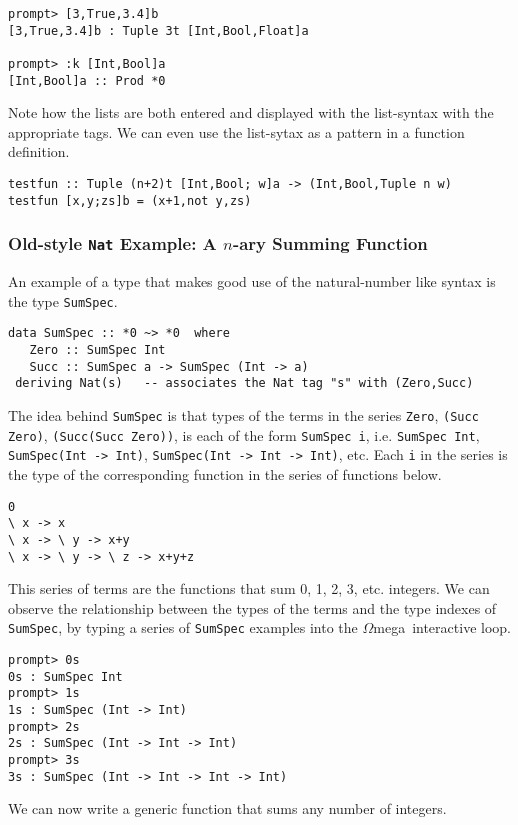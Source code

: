 \documentclass[11pt,twoside]{article}
\newcommand{\om}{$\Omega$mega}
\begin{document}
\begin{verbatim}
prompt> [3,True,3.4]b
[3,True,3.4]b : Tuple 3t [Int,Bool,Float]a

prompt> :k [Int,Bool]a
[Int,Bool]a :: Prod *0 
\end{verbatim} 

Note how the lists are both entered and displayed with
the list-syntax with the appropriate tags. We can even use the list-sytax
as a pattern in a function definition.

\begin{verbatim}
testfun :: Tuple (n+2)t [Int,Bool; w]a -> (Int,Bool,Tuple n w)
testfun [x,y;zs]b = (x+1,not y,zs) 
\end{verbatim} 

\subsubsection{Old-style {\tt Nat} Example: A $n$-ary Summing Function}

An example of a type that makes good
use of the natural-number like syntax is the type {\tt SumSpec}.

\begin{verbatim}
data SumSpec :: *0 ~> *0  where
   Zero :: SumSpec Int 
   Succ :: SumSpec a -> SumSpec (Int -> a)
 deriving Nat(s)   -- associates the Nat tag "s" with (Zero,Succ)
\end{verbatim} 
The idea behind {\tt SumSpec} is that types of the
terms in the series {\tt Zero},
{\tt (Succ Zero)}, {\tt (Succ(Succ Zero))}, is each
of the form {\tt SumSpec i}, i.e. {\tt SumSpec Int}, {\tt SumSpec(Int -> Int)},
{\tt SumSpec(Int -> Int -> Int)}, etc. Each {\tt i} in the series
is the type of the corresponding function in the series of functions below.
\begin{verbatim}
0
\ x -> x
\ x -> \ y -> x+y
\ x -> \ y -> \ z -> x+y+z
\end{verbatim}
This series of terms are the functions that sum 0, 1, 2, 3, etc. integers.
We can observe the relationship between the types of the terms and
the type indexes of {\tt SumSpec}, by typing a series of {\tt SumSpec} examples into the \om\ interactive loop.
\begin{verbatim}
prompt> 0s
0s : SumSpec Int
prompt> 1s
1s : SumSpec (Int -> Int)
prompt> 2s
2s : SumSpec (Int -> Int -> Int)
prompt> 3s
3s : SumSpec (Int -> Int -> Int -> Int)
\end{verbatim}
We can now write a generic function that sums any number of integers.
\end{document}
